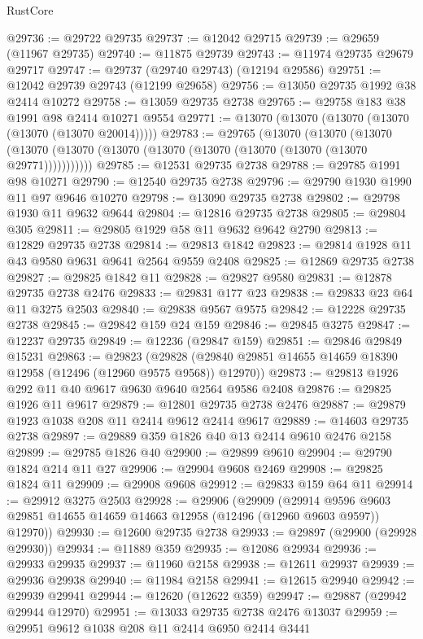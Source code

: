 \begin{lexlean}{RustCore}
\begin{coremodule}
@29736 := @29722 @29735
@29737 := @12042 @29715
@29739 := @29659 (@11967 @29735)
@29740 := @11875 @29739
@29743 := @11974 @29735 @29679 @29717
@29747 := @29737 (@29740 @29743) (@12194 @29586)
@29751 := @12042 @29739 @29743 (@12199 @29658)
@29756 := @13050 @29735 @1992 @38 @2414 @10272
@29758 := @13059 @29735 @2738
@29765 := @29758 @183 @38 @1991 @98 @2414 @10271 @9554
@29771 := @13070 (@13070 (@13070 (@13070 (@13070 (@13070 @20014)))))
@29783 := @29765
    (@13070
      (@13070
        (@13070 (@13070 (@13070 (@13070 (@13070 (@13070 (@13070 (@13070 (@13070 @29771)))))))))))
@29785 := @12531 @29735 @2738
@29788 := @29785 @1991 @98 @10271
@29790 := @12540 @29735 @2738
@29796 := @29790 @1930 @1990 @11 @97 @9646 @10270
@29798 := @13090 @29735 @2738
@29802 := @29798 @1930 @11 @9632 @9644
@29804 := @12816 @29735 @2738
@29805 := @29804 @305
@29811 := @29805 @1929 @58 @11 @9632 @9642 @2790
@29813 := @12829 @29735 @2738
@29814 := @29813 @1842
@29823 := @29814 @1928 @11 @43 @9580 @9631 @9641 @2564 @9559 @2408
@29825 := @12869 @29735 @2738
@29827 := @29825 @1842 @11
@29828 := @29827 @9580
@29831 := @12878 @29735 @2738 @2476
@29833 := @29831 @177 @23
@29838 := @29833 @23 @64 @11 @3275 @2503
@29840 := @29838 @9567 @9575
@29842 := @12228 @29735 @2738
@29845 := @29842 @159 @24 @159
@29846 := @29845 @3275
@29847 := @12237 @29735
@29849 := @12236 (@29847 @159)
@29851 := @29846 @29849 @15231
@29863 := @29823
    (@29828 (@29840 @29851 @14655 @14659 @18390 @12958 (@12496 (@12960 @9575 @9568)) @12970))
@29873 := @29813 @1926 @292 @11 @40 @9617 @9630 @9640 @2564 @9586 @2408
@29876 := @29825 @1926 @11 @9617
@29879 := @12801 @29735 @2738 @2476
@29887 := @29879 @1923 @1038 @208 @11 @2414 @9612 @2414 @9617
@29889 := @14603 @29735 @2738
@29897 := @29889 @359 @1826 @40 @13 @2414 @9610 @2476 @2158
@29899 := @29785 @1826 @40
@29900 := @29899 @9610
@29904 := @29790 @1824 @214 @11 @27
@29906 := @29904 @9608 @2469
@29908 := @29825 @1824 @11
@29909 := @29908 @9608
@29912 := @29833 @159 @64 @11
@29914 := @29912 @3275 @2503
@29928 := @29906
    (@29909
      (@29914 @9596 @9603 @29851 @14655 @14659 @14663 @12958 (@12496 (@12960 @9603 @9597)) @12970))
@29930 := @12600 @29735 @2738
@29933 := @29897 (@29900 (@29928 @29930))
@29934 := @11889 @359
@29935 := @12086 @29934
@29936 := @29933 @29935
@29937 := @11960 @2158
@29938 := @12611 @29937
@29939 := @29936 @29938
@29940 := @11984 @2158
@29941 := @12615 @29940
@29942 := @29939 @29941
@29944 := @12620 (@12622 @359)
@29947 := @29887 (@29942 @29944 @12970)
@29951 := @13033 @29735 @2738 @2476 @13037
@29959 := @29951 @9612 @1038 @208 @11 @2414 @6950 @2414 @3441

\end{coremodule}
\end{lexlean}
